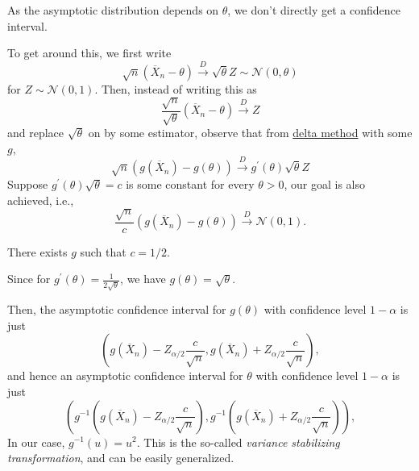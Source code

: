 \begin{note}
	As the asymptotic distribution depends on \(\theta \), we don't directly get a confidence interval.
\end{note}

To get around this, we first write
\[
	\sqrt{n} (\overline{X} _n - \theta )
	\overset{D}{\to} \sqrt{\theta } Z \sim \mathcal{N} (0, \theta )
\]
for \(Z \sim \mathcal{N} (0, 1)\). Then, instead of writing this as
\[
	\frac{\sqrt{n} }{\sqrt{\theta } } (\overline{X} _n - \theta ) \overset{D}{\to} Z
\]
and replace \(\sqrt{\theta } \) on by some estimator, observe that from \hyperref[thm:delta-method]{delta method} with some \(g\),
\[
	\sqrt{n} (g(\overline{X} _n) - g(\theta )) \overset{D}{\to} g^{\prime} (\theta ) \sqrt{\theta } Z
\]
Suppose \(g^{\prime} (\theta ) \sqrt{\theta } = c \) is some constant for every \(\theta > 0\), our goal is also achieved, i.e.,
\[
	\frac{\sqrt{n}}{c} (g(\overline{X} _n) - g(\theta )) \overset{D}{\to} \mathcal{N} (0, 1).
\]

\begin{claim}
	There exists \(g\) such that \(c = 1 / 2\).
\end{claim}
\begin{explanation}
	Since for \(g^{\prime} (\theta ) = \frac{1}{2 \sqrt{\theta } }\), we have \(g(\theta ) = \sqrt{\theta } \).
\end{explanation}

Then, the asymptotic confidence interval for \(g(\theta )\) with confidence level \(1 - \alpha \) is just
\[
	\left( g(\overline{X} _n) - Z_{\alpha / 2} \frac{c}{\sqrt{n} } , g(\overline{X} _n) + Z_{\alpha / 2} \frac{c}{\sqrt{n} } \right),
\]
and hence an asymptotic confidence interval for \(\theta \) with confidence level \(1 - \alpha \) is just
\[
	\left( g^{-1} \left( g(\overline{X} _n) - Z_{\alpha / 2} \frac{c}{\sqrt{n} } \right) , g^{-1} \left( g(\overline{X} _n) + Z_{\alpha / 2} \frac{c}{\sqrt{n} } \right) \right),
\]
In our case, \(g^{-1} (u) = u^2\). This is the so-called \emph{variance stabilizing transformation}, and can be easily generalized.